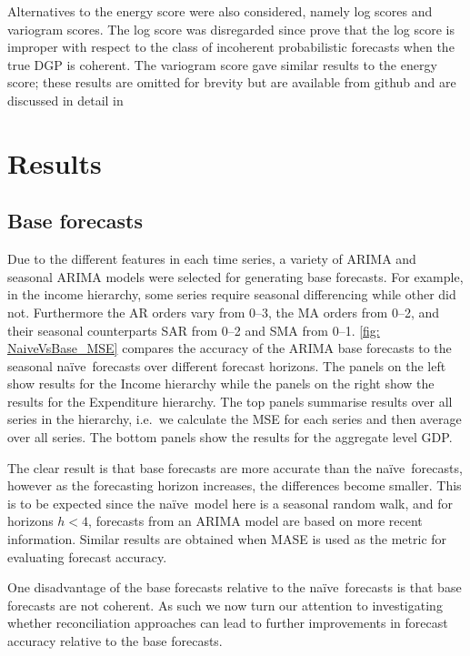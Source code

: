 \documentclass[a4paper, 11pt]{article}
\def\naive{na\"{i}ve\ }
\begin{document}
Alternatives to the energy score were also considered, namely log scores and variogram scores. The log score was disregarded since \citet{GamEtAl2018} prove that the log score is improper with respect to the class of incoherent probabilistic forecasts when the true DGP is coherent. The variogram score gave similar results to the energy score;  these results are omitted for brevity but are available from github and are discussed in detail in \cite{gamakumara2019phd}


\section{Results}\label{sec:results}

\subsection{Base forecasts}

Due to the different features in each time series, a variety of ARIMA and seasonal ARIMA models were selected for generating base forecasts. For example, in the income hierarchy, some series require seasonal differencing while other did not. Furthermore the AR orders vary from 0--3, the MA orders from 0--2, and their seasonal counterparts SAR from 0--2 and SMA from 0--1. \autoref{fig: NaiveVsBase_MSE} compares the accuracy of the ARIMA base forecasts to the seasonal \naive forecasts over different forecast horizons. The panels on the left show results for the Income hierarchy while the panels on the right show the results for the Expenditure hierarchy. The top panels summarise results over all series in the hierarchy, i.e.\ we calculate the MSE for each series and then average over all series. The bottom panels show the results for the aggregate level GDP.

The clear result is that base forecasts are more accurate than the \naive forecasts, however as the forecasting horizon increases, the differences become smaller. This is to be expected since the \naive model here is a seasonal random walk, and for horizons $h<4$, forecasts from an ARIMA model are based on more recent information. Similar results are obtained when MASE is used as the metric for evaluating forecast accuracy.

One disadvantage of the base forecasts relative to the \naive forecasts is that base forecasts are not coherent. As such we now turn our attention to investigating whether reconciliation approaches can lead to further improvements in forecast accuracy relative to the base forecasts.
\end{document}
